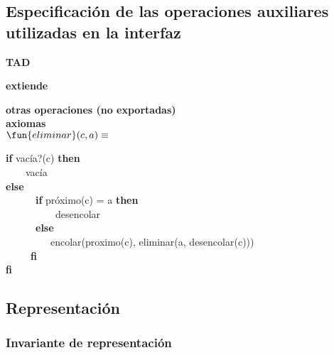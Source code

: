 \subsection{Especificación de las operaciones auxiliares utilizadas en la interfaz}

\textbf{TAD} 

\textbf{extiende} 

\textbf{otras operaciones (no exportadas)}\\
\textbf{axiomas} \\
$\fun{eliminar}(c,a) \equiv$ \begin{alignhere}  \textbf{if} vacía?(c) \textbf{then} \\
													\ \ \ \ vacía \\
												\textbf{else}\\
													\ \ \ \ \ \ \textbf{if} próximo(c) = a \textbf{then}\\
														\ \ \ \ \ \ \ \ \ \ desencolar \\
													\ \ \ \ \ \ \textbf{else} \\
														\ \ \ \ \ \ \ \ \ encolar(proximo(c), eliminar(a, desencolar(c)))
													\\ \ \ \ \ \ \textbf{fi}
												\\ \textbf{fi}
								\end{alignhere}





\subsection{Representación}



\subsubsection*{Invariante de representación}

